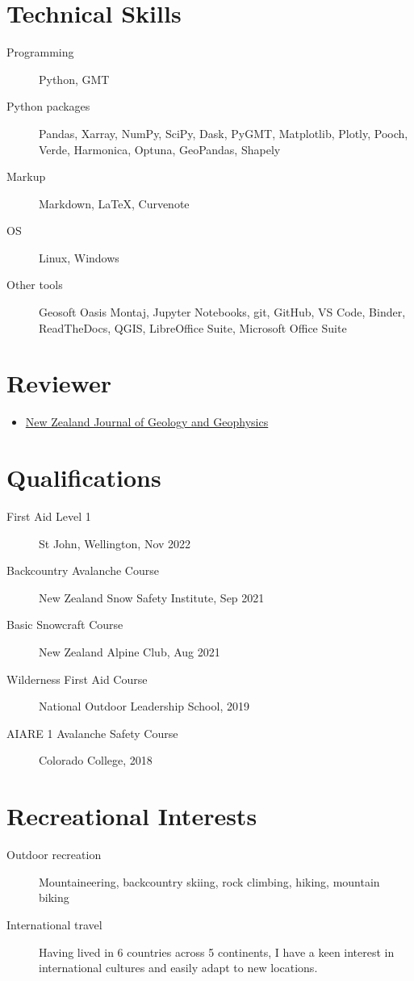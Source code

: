 \documentclass{ExpressiveResume}
\begin{document}
\section{Technical Skills}
\begin{description}
    \item[Programming] Python, GMT
    \item[Python packages] Pandas, Xarray, NumPy, SciPy, Dask, PyGMT,
        Matplotlib, Plotly, Pooch, Verde, Harmonica, Optuna, GeoPandas, Shapely
    \item[Markup] Markdown, \LaTeX, Curvenote
    \item[OS] Linux, Windows
    \item[Other tools] Geosoft Oasis Montaj, Jupyter Notebooks, git,
        GitHub, VS Code, Binder,
        ReadTheDocs, QGIS, LibreOffice Suite, Microsoft Office Suite
\end{description}


\section{Reviewer}
\begin{itemize}[label={}, leftmargin=*]
    \item \href{https://www.tandfonline.com/toc/tnzg20/current}{New
              Zealand Journal of Geology and Geophysics}
\end{itemize}


\section{Qualifications}
\begin{description}
    \item[First Aid Level 1] St John, Wellington, Nov 2022
    \item[Backcountry Avalanche Course] New Zealand Snow Safety Institute,
        Sep 2021
    \item[Basic Snowcraft Course] New Zealand Alpine Club, Aug 2021
    \item[Wilderness First Aid Course] National Outdoor Leadership
        School, 2019
    \item[AIARE 1 Avalanche Safety Course] Colorado College, 2018
\end{description}


\section{Recreational Interests}
\begin{description}
    \item[Outdoor recreation] Mountaineering, backcountry skiing, rock climbing, hiking, mountain biking
    \item[International travel] Having lived in 6 countries across 5
        continents, I have a keen interest in international
        cultures and easily adapt to new locations.
\end{description}
\end{document}
